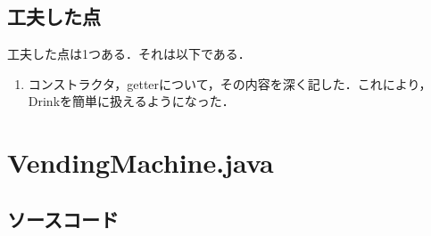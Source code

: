 \documentclass{jlreq}
\begin{document}
  \subsection{工夫した点}
  工夫した点は1つある．それは以下である．
  \begin{enumerate}[(1). ]
    \item コンストラクタ，getterについて，その内容を深く記した．これにより，Drinkを簡単に扱えるようになった．
  \end{enumerate}

  \newpage

  \section{VendingMachine.java}

  \subsection{ソースコード}
\end{document}
